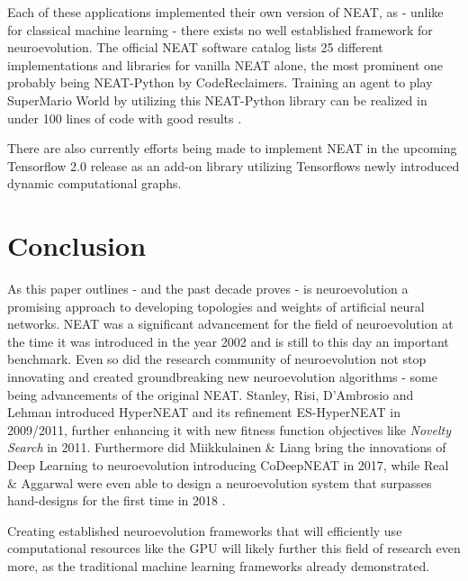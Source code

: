 \documentclass[journal, a4paper]{IEEEtran}
\begin{document}
Each of these applications implemented their own version of NEAT, as - unlike for classical machine learning - there exists no well established framework for neuroevolution. The official NEAT software catalog \cite{neat_software19} lists 25 different implementations and libraries for vanilla NEAT alone, the most prominent one probably being NEAT-Python \cite{cod19} by CodeReclaimers. Training an agent to play SuperMario World by utilizing this NEAT-Python library can be realized in under 100 lines of code with good results \cite{pau19_smw}.

There are also currently efforts being made \cite{pau19_tefne} to implement NEAT in the upcoming Tensorflow 2.0 \cite{tf_beta19} release as an add-on \cite{tf_addons19} library utilizing Tensorflows newly introduced dynamic computational graphs.




\section{Conclusion}

As this paper outlines - and the past decade proves - is neuroevolution a promising approach to developing topologies and weights of artificial neural networks. NEAT was a significant advancement for the field of neuroevolution at the time it was introduced in the year 2002 and is still to this day an important benchmark. Even so did the research community of neuroevolution not stop innovating and created groundbreaking new neuroevolution algorithms - some being advancements of the original NEAT. Stanley, Risi, D'Ambrosio and Lehman introduced HyperNEAT \cite{sta09} and its refinement ES-HyperNEAT \cite{ris11} in 2009/2011, further enhancing it with new fitness function objectives like \textit{Novelty Search} \cite{leh11} in 2011. Furthermore did Miikkulainen \& Liang bring the innovations of Deep Learning to neuroevolution introducing CoDeepNEAT \cite{mii17} in 2017, while Real \& Aggarwal were even able to design a neuroevolution system that surpasses hand-designs for the first time in 2018 \cite{rea19}.

Creating established neuroevolution frameworks that will efficiently use computational resources like the GPU will likely further this field of research even more, as the traditional machine learning frameworks already demonstrated.
\end{document}
